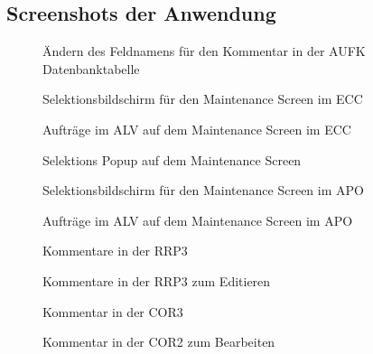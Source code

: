 \subsection{Screenshots der Anwendung}
\label{Screenshots}
\begin{figure}[htb]
\centering
{}
\caption{Ändern des Feldnamens für den Kommentar in der AUFK Datenbanktabelle}
\end{figure}
\clearpage
\begin{figure}[htb]
\centering
{}
\caption{Selektionsbildschirm für den Maintenance Screen im ECC}
\end{figure}
\clearpage
\begin{figure}[htb]
\centering
{}
\caption{Aufträge im ALV auf dem Maintenance Screen im ECC}
\end{figure}
\clearpage
\begin{figure}[htb]
\centering
{}
\caption{Selektions Popup auf dem Maintenance Screen}
\end{figure}
\clearpage
\begin{figure}[htb]
\centering
{}
\caption{Selektionsbildschirm für den Maintenance Screen im APO}
\end{figure}
\clearpage
\begin{figure}[htb]
\centering
{}
\caption{Aufträge im ALV auf dem Maintenance Screen im APO}
\end{figure}
\clearpage
\begin{figure}[htb]
\centering
{}
\caption{Kommentare in der RRP3}
\end{figure}
\clearpage
\begin{figure}[htb]
\centering
{}
\caption{Kommentare in der RRP3 zum Editieren}
\end{figure}
\clearpage
\begin{figure}[htb]
\centering
{}
\caption{Kommentar in der COR3}
\end{figure}
\clearpage
\begin{figure}[htb]
\centering
{}
\caption{Kommentar in der COR2 zum Bearbeiten}
\end{figure}
\clearpage